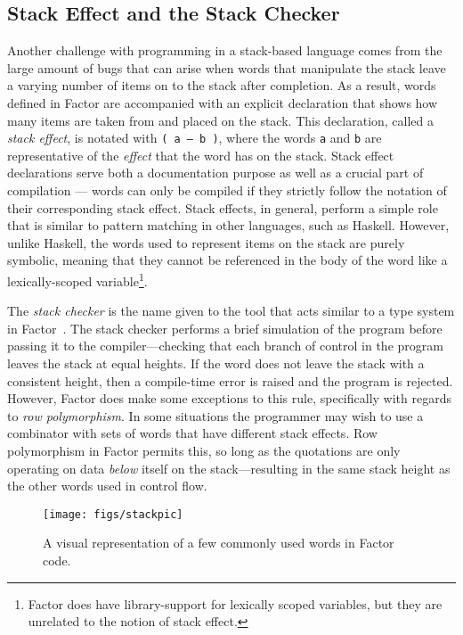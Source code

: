 \documentclass[sigconf]{acmart}
\begin{document}
\subsection{Stack Effect and the Stack Checker}
Another challenge with programming in a stack-based language
comes from the large amount of bugs that can arise when words
that manipulate the stack leave a varying number of items on to
the stack after completion. As a result, words defined in
Factor are accompanied with an explicit declaration that shows
how many items are taken from and placed on the stack. This 
declaration, called a \textit{stack effect}, is notated with
\texttt{( a -- b )}, where the words \texttt{a} and \texttt{b} are 
representative of the \textit{effect} that the word has on the
stack. Stack effect declarations serve both a documentation
purpose as well as a crucial part of compilation --- words can 
only be compiled if they strictly follow the notation of their
corresponding stack effect. Stack effects, in general, perform a 
simple role that is similar to pattern matching in other languages,
such as Haskell. However, unlike Haskell, the words used 
to represent items on the stack are purely symbolic, meaning that 
they cannot be referenced in the body of the word like a 
lexically-scoped variable\footnote{Factor does have library-support 
for lexically scoped variables, but they are unrelated to the 
notion of stack effect.}.

The \textit{stack checker} is the name given to the tool that acts
similar to a type system in Factor~\cite{pestov:Factor}. The
stack checker performs a brief simulation of the program 
before passing it to the compiler---checking that each
branch of control in the program leaves the stack at equal 
heights. If the word does not leave the stack with a consistent
height, then a compile-time error is raised and the program is
rejected. However, Factor does make some exceptions to this rule,
specifically with regards to \textit{row polymorphism}. In some
situations the programmer may wish to use a combinator with
sets of words that have different stack effects. Row polymorphism
in Factor permits this, so long as the quotations are only
operating on data \textit{below} itself on the stack---resulting
in the same stack height as the other words used in control flow.

\begin{figure}
\texttt{[image: figs/stackpic]}
\caption{A visual representation of a few commonly used words in 
Factor code.}\label{fig:stackpic}\end{figure}
\end{document}

